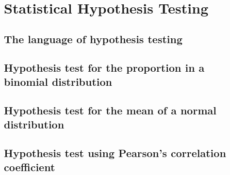 \chapter{Statistical Hypothesis Testing}

\section{The language of hypothesis testing}
\section{Hypothesis test for the proportion in a binomial distribution}
\section{Hypothesis test for the mean of a normal distribution}
\section{Hypothesis test using Pearson’s correlation coefficient}